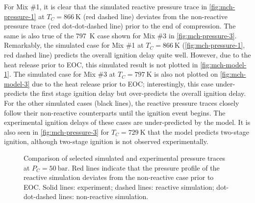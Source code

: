 \documentclass[../main.tex]{subfiles}
\begin{document}
For Mix \#1, it is clear that the simulated reactive pressure trace in
\cref{fig:mch-pressure-1} at $T_C=\SI{866}{\kelvin}$ (red dashed line) deviates from
the non-reactive pressure trace (red dot-dot-dashed line) prior to the end of
compression. The same is also true of the \SI{797}{\kelvin} case shown for Mix \#3 in
\cref{fig:mch-pressure-3}. Remarkably, the simulated case for Mix \#1 at
$T_C=\SI{866}{\kelvin}$ (\cref{fig:mch-pressure-1}, red dashed line)
predicts the overall ignition delay quite well. However, due to the
heat release prior to EOC, this simulated result is not plotted in
\cref{fig:mch-model-1}. The simulated case for Mix \#3 at $T_C=\SI{797}{\kelvin}$ is also
not plotted on \cref{fig:mch-model-3} due to the heat release prior to EOC;
interestingly, this case under-predicts the first stage ignition delay but
over-predicts the overall ignition delay. For the other simulated cases (black
lines), the reactive pressure traces closely follow their non-reactive
counterparts until the ignition event begins. The experimental ignition delays
of these cases are under-predicted by the model. It is also seen in
\cref{fig:mch-pressure-3} for $T_C=\SI{729}{\kelvin}$ that the model predicts two-stage
ignition, although two-stage ignition is not observed experimentally.

\begin{figure}
    {\caption{Comparison of selected simulated and experimental pressure traces
        at $P_C=\SI{50}{\bar}$. Red lines
        indicate that the pressure profile of the reactive simulation deviates
        from the non-reactive case prior to EOC. Solid lines: experiment;
        dashed lines: reactive simulation; dot-dot-dashed lines: non-reactive
        simulation.}
    \label{fig:mch-pressure}}
\end{figure}
\end{document}
